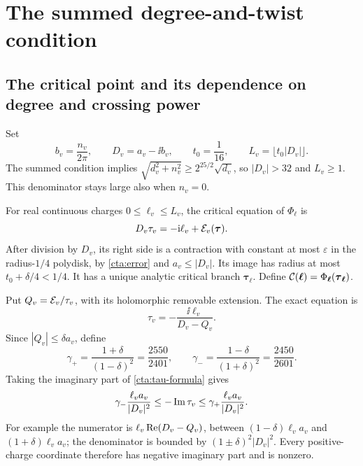 \section{The summed degree-and-twist condition}\label{ct:summed-section}
\subsection{The critical point and its dependence on degree and crossing power}
\label{cta:critical}

Set
\begin{equation}\label{cta:D}
 b_v=\frac{n_v}{2\pi},\qquad D_v=a_v-\ii b_v,\qquad
 t_0=\frac1{16},\qquad L_v=\lfloor t_0|D_v|\rfloor .
\end{equation}
The summed condition implies
\(\sqrt{d_v^2+n_v^2}\ge2^{25/2}\sqrt{d_v}\), so
\(|D_v|>32\) and \(L_v\ge1\). This denominator stays large
also when \(n_v=0\).

For real continuous charges \(0\le\ell_v\le L_v\), the critical
equation of \(\Phi_{\boldsymbol\ell}\) is
\begin{equation}\label{cta:fixedpoint}
 D_v\tau_v=-\mathrm i\ell_v+\mathcal E_v(\boldsymbol\tau).
\end{equation}
After division by \(D_v\), its right side is a contraction
with constant at most \(\varepsilon\) in the radius-\(1/4\)
polydisk, by \eqref{cta:error} and \(a_v\le|D_v|\).
Its image has radius at most \(t_0+\delta/4<1/4\).
It has a unique analytic critical branch
\(\boldsymbol\tau_{\boldsymbol\ell}\). Define
\(\mathcal C(\boldsymbol\ell)=
\Phi_{\boldsymbol\ell}(\boldsymbol\tau_{\boldsymbol\ell})\).

Put \(Q_v=\mathcal E_v/\tau_v\), with its holomorphic removable
extension. The exact equation is
\begin{equation}\label{cta:tau-formula}
 \tau_v=-\frac{\ii\ell_v}{D_v-Q_v}.
\end{equation}
Since \(|Q_v|\le\delta a_v\), define
\[
 \gamma_+=\frac{1+\delta}{(1-\delta)^2}
          =\frac{2550}{2401},\qquad
 \gamma_-=\frac{1-\delta}{(1+\delta)^2}
          =\frac{2450}{2601}.
\]
Taking the imaginary part of \eqref{cta:tau-formula} gives
\begin{equation}\label{cta:imaginary}
 \gamma_-\frac{\ell_va_v}{|D_v|^2}
 \le-\operatorname{Im}\tau_v
 \le\gamma_+\frac{\ell_va_v}{|D_v|^2}.
\end{equation}
For example the numerator is
\(\ell_v\operatorname{Re}(D_v-Q_v)\), between
\((1-\delta)\ell_va_v\) and \((1+\delta)\ell_va_v\);
the denominator is bounded by
\((1\pm\delta)^2|D_v|^2\).
Every positive-charge coordinate therefore has negative
imaginary part and is nonzero.

